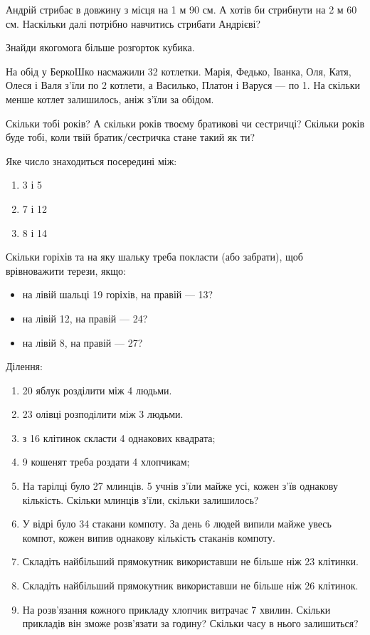 \problem
Андрій стрибає в довжину з місця на 1 м 90 см.
А хотів би стрибнути на 2 м 60 см.
Наскільки далі потрібно навчитись стрибати Андрієві?


\problem
Знайди якогомога більше розгорток кубика.


\problem
На обід у БеркоШко насмажили 32 котлетки.
Марія, Федько, Іванка, Оля, Катя, Олеся і Валя з’їли по 2 котлети,
а Василько, Платон і Варуся --- по 1.
На скільки менше котлет залишилось, аніж з’їли за обідом.


\problem
Скільки тобі років?
А скільки років твоєму братикові чи сестричці?
Скільки років буде тобі, коли твій братик/сестричка стане такий як ти?


\problem
Яке число знаходиться посередині між:
\begin{multicols}{3}
    \begin{enumerate}
        \item 3 і 5
        \item 7 і  12
        \item 8 і 14
    \end{enumerate}
\end{multicols}


\problem
Скільки горіхів та на яку шальку треба покласти (або забрати),
щоб врівноважити терези, якщо:
\begin{itemize}
    \item на лівій шальці 19 горіхів, на правій --- 13?
    \item на лівій 12, на правій --- 24?
    \item на лівій 8, на правій --- 27?
\end{itemize}


\problem
Ділення:
\begin{enumerate}
    \item 20 яблук розділити між 4 людьми.
    \item 23 олівці розподілити між 3 людьми.
    \item з 16 клітинок скласти 4 однакових квадрата;
    \item 9 кошенят треба роздати 4 хлопчикам;
    \item На тарілці було 27 млинців. 5 учнів з'їли майже усі,
    кожен з'їв однакову кількість.
    Скільки млинців з'їли, скільки залишилось?
    \item У відрі було 34 стакани компоту.
    За день 6 людей випили майже увесь компот,
    кожен випив однакову кількість стаканів компоту.
    \item Складіть найбільший прямокутник використавши
    не більше ніж 23 клітинки.
    \item Складіть найбільший прямокутник використавши
    не більше ніж 26 клітинок.
    \item На розв'язання кожного прикладу хлопчик витрачає 7 хвилин.
    Скільки прикладів він зможе розв'язати за годину?
    Скільки часу в нього залишиться?
\end{enumerate}


